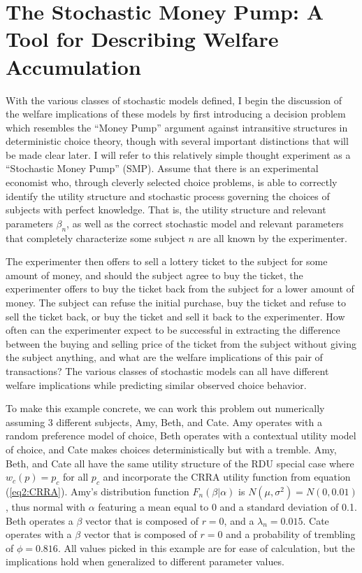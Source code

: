 \documentclass[../main.tex]{subfiles}
\begin{document}
\singlespacing
\section[The Stochastic Money Pump: A Tool for Describing Welfare Accumulation]{The Stochastic Money Pump: A Tool for Describing Welfare Accumulation}
\doublespacing

With the various classes of stochastic models defined, I begin the discussion of the welfare implications of these models by first introducing a decision problem which resembles the \enquote{Money Pump} argument against intransitive structures in deterministic choice theory, though with several important distinctions that will be made clear later.
I will refer to this relatively simple thought experiment as a \enquote{Stochastic Money Pump} (SMP).
Assume that there is an experimental economist who, through cleverly selected choice problems, is able to correctly identify the utility structure and stochastic process governing the choices of subjects with perfect knowledge.
That is, the utility structure and relevant parameters $\beta_n$, as well as the correct stochastic model and relevant parameters that completely characterize some subject $n$ are all known by the experimenter.

The experimenter then offers to sell a lottery ticket to the subject for some amount of money, and should the subject agree to buy the ticket, the experimenter offers to buy the ticket back from the subject for a lower amount of money.
The subject can refuse the initial purchase, buy the ticket and refuse to sell the ticket back, or buy the ticket and sell it back to the experimenter.
How often can the experimenter expect to be successful in extracting the difference between the buying and selling price of the ticket from the subject without giving the subject anything, and what are the welfare implications of this pair of transactions?
The various classes of stochastic models can all have different welfare implications while predicting similar observed choice behavior.

To make this example concrete, we can work this problem out numerically assuming 3 different subjects, Amy, Beth, and Cate.
Amy operates with a random preference model of choice, Beth operates with a contextual utility model of choice, and Cate makes choices deterministically but with a tremble.
Amy, Beth, and Cate all have the same utility structure of the RDU special case where $w_c(p)=p_c$ for all $p_c$ and incorporate the CRRA utility function from equation (\ref{eq2:CRRA}).
Amy's distribution function $F_n(\beta|\alpha)$ is $N(\mu,\sigma^2) = N(0,0.01)$, thus normal with $\alpha$ featuring a mean equal to 0 and a standard deviation of 0.1.
Beth operates a $\beta$ vector that is composed of $r=0$, and a $\lambda_n = 0.015$.
Cate operates with a $\beta$ vector that is composed of $r=0$ and a probability of trembling of $\phi = 0.816$.
All values picked in this example are for ease of calculation, but the implications hold when generalized to different parameter values.
\end{document}

